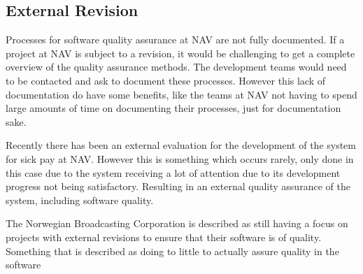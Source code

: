 

\subsection{External Revision}
Processes for software quality assurance at NAV are not fully documented. If a project at NAV is subject to a revision, it would be challenging to get a complete overview of the quality assurance methods. The development teams would need to be contacted and ask to document these processes. However this lack of documentation do have some benefits, like the teams at NAV not having to spend large amounts of time on documenting their processes, just for documentation sake.

Recently there has been an external evaluation for the development of the system for sick pay at NAV. However this is something which occurs rarely, only done in this case due to the system receiving a lot of attention due to its development progress not being satisfactory. Resulting in an external quality assurance of the system, including software quality.

The Norwegian Broadcasting Corporation is described as still having a focus on projects with external revisions to ensure that their software is of quality. Something that is described as doing to little to actually assure quality in the software



